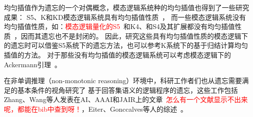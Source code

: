 均匀插值作为遗忘的一个对偶概念，模态逻辑系统种的均匀插值也得到了一些研究成果：
S5、K和KD模态逻辑系统具有均匀插值性质~\cite{DBLP:journals/aml/Iemhoff19}，
而一些模态逻辑系统没有均匀插值性质，如：\textcolor{red}{模态逻辑量化的S5}~\cite{DBLP:journals/jsyml/Fine79}和K4、和S4及其扩展都没有均匀插值性质~\cite{DBLP:journals/ndjfl/Schumm86}，因而其遗忘也不是封闭的。
因此，研究这些具有均匀插值性质的模态逻辑下的遗忘时可以借鉴S5系统下的遗忘方法，也可以参考K系统下的基于归结计算均匀插值的方法。
对于那些没有均匀插值的模态逻辑系统可以考虑模态逻辑下的Ackermann引理~\cite{DBLP:books/daglib/0023036}。



在非单调推理（non-monotonic reasoning）环境中，科研工作者们也从遗忘需要满足的基本条件的视角研究了
基于回答集语义的逻辑程序的遗忘，这些工作包括Zhang、Wang等人发表在AI、AAAI和JAIR上的文章~\cite{DBLP:Zhang:AIJ2006,DBLP:journals/ai/EiterW08,Wong:PhD:Thesis,DBLP:journals/jair/WangZZZ14,wang2013forgetting,DBLP:conf/aaai/WangWWZ15,DBLP:journals/jair/Delgrande17,gonccalves2020limits}\textcolor{red}{怎么有一个文献显示不出来呢，都能在bib中查到呀！}，Eiter、Gonccalves等人的综述~\cite{eiter2019brief,gonccalves2021forgetting}。


